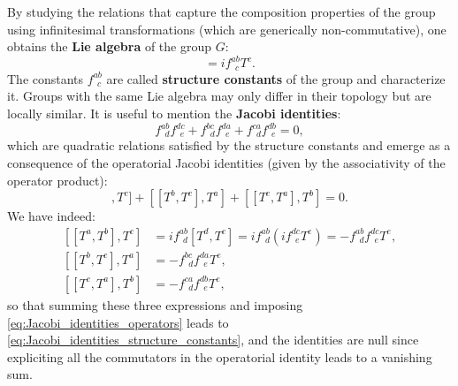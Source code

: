 By studying the relations that capture the composition properties of the group using infinitesimal transformations (which are generically non-commutative), one obtains the \textbf{Lie algebra} of the group $G$:
\begin{equation}
    [T^a, T^b] = i f^{ab}_{\ \ c} T^c.
    \label{eq:general_Lie_algebra}
\end{equation}
The constants $f^{ab}_{\ \ c}$ are called \textbf{structure constants} of the group and characterize it. Groups with the same Lie algebra may only differ in their topology but are locally similar. It is useful to mention the \textbf{Jacobi identities}:
\begin{equation}
    f^{ab}_{\ \ d} f^{dc}_{\ \ e} + f^{bc}_{\ \ d} f^{da}_{\ \ e} + f^{ca}_{\ \ d} f^{db}_{\ \ e} = 0,
    \label{eq:Jacobi_identities_structure_constants}
\end{equation}
which are quadratic relations satisfied by the structure constants and emerge as a consequence of the operatorial Jacobi identities (given by the associativity of the operator product):
\begin{equation}
    [[T^a, T^b], T^c] + [[T^b, T^c], T^a] + [[T^c, T^a], T^b] = 0.
    \label{eq:Jacobi_identities_operators}
\end{equation}
We have indeed:
\[
    \begin{aligned}
        [[T^a, T^b], T^c] & = i f^{ab}_{\ \ d} [T^d, T^c] = i f^{ab}_{\ \ d} (i f^{dc}_{\ \ e} T^e) = - f^{ab}_{\ \ d} f^{dc}_{\ \ e} T^e, \\
        [[T^b, T^c], T^a] & = - f^{bc}_{\ \ d} f^{da}_{\ \ e} T^e,                                                                         \\
        [[T^c, T^a], T^b] & = - f^{ca}_{\ \ d} f^{db}_{\ \ e} T^e,
    \end{aligned}
\]
so that summing these three expressions and imposing \eqref{eq:Jacobi_identities_operators} leads to \eqref{eq:Jacobi_identities_structure_constants}, and the identities are null since expliciting all the commutators in the operatorial identity leads to a vanishing sum.

